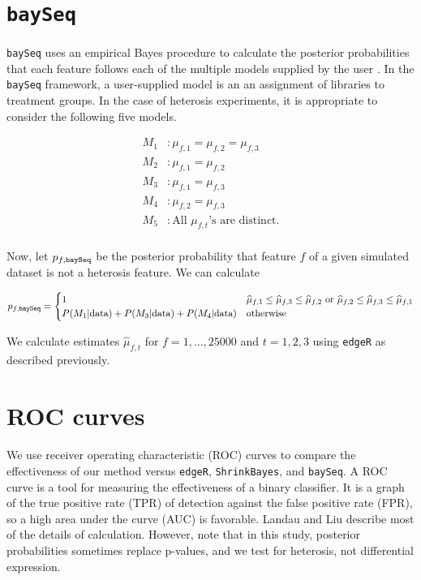 \documentclass{article}
\providecommand{\wh}[1]{\widehat{#1}}
\begin{document}
\begin{flushleft}
\section{{\tt baySeq}}

\paragraph{} {\tt baySeq} uses an empirical Bayes procedure to calculate the posterior probabilities that each feature follows each of the multiple models supplied by the user \cite{baySeq}. In the {\tt baySeq} framework, a user-supplied model is an an assignment of libraries to treatment groups. In the case of heterosis experiments, it is appropriate to consider the following five models.

\begin{align*}
M_1&: \mu_{f, 1} = \mu_{f, 2} = \mu_{f, 3} \\
M_2&: \mu_{f, 1} = \mu_{f, 2} \\
M_3&: \mu_{f, 1} = \mu_{f, 3} \\
M_4&: \mu_{f, 2} = \mu_{f, 3} \\
M_5&: \text{All } \mu_{f, t}\text{'s are distinct.} \\
\end{align*}

Now, let $p_{f, {\tt baySeq}}$ be the posterior probability that feature $f$ of a given simulated dataset is not a heterosis feature. We can calculate

\begin{align*}
p_{f, {\tt baySeq}} = \begin{cases}
1 & \wh{\mu}_{f, 1} \le \wh{\mu}_{f, 3} \le \wh{\mu}_{f, 2} \text{ or } \wh{\mu}_{f, 2} \le \wh{\mu}_{f, 3} \le \wh{\mu}_{f, 1} \\
P(M_1 | \text{data}) + P(M_3 | \text{data}) + P(M_4 | \text{data}) & \text{otherwise}
\end{cases}
\end{align*}

We calculate estimates $\wh{\mu}_{f, t}$ for $f = 1, \ldots, 25000$ and $t = 1, 2, 3$ using {\tt edgeR} as described previously.

\section{ROC curves}

\paragraph{} We use receiver operating characteristic (ROC) curves to compare the effectiveness of our method versus {\tt edgeR}, {\tt ShrinkBayes}, and {\tt baySeq}. A ROC curve is a tool for measuring the effectiveness of a binary classifier. It is a graph of the true positive rate (TPR) of detection against the false positive rate (FPR), so a high area under the curve (AUC) is favorable. Landau and Liu \cite{LandauLiu} describe most of the details of calculation. However, note that in this study, posterior probabilities sometimes replace p-values, and we test for heterosis, not differential expression.

\end{flushleft}



\end{document}
